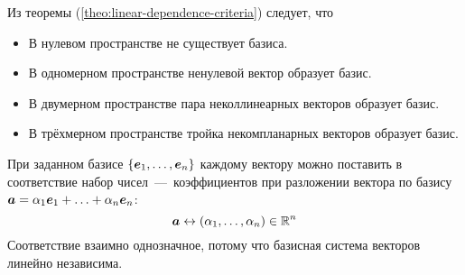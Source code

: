 \documentclass[a4paper,12pt]{article}
\begin{document}
  Из теоремы (\ref{theo:linear-dependence-criteria}) следует, что
  \begin{itemize}
    \item В нулевом пространстве не существует базиса.
    \item В одномерном пространстве ненулевой вектор образует базис.
    \item В двумерном пространстве пара неколлинеарных векторов образует базис.
    \item В трёхмерном пространстве тройка некомпланарных векторов образует базис.
  \end{itemize}
  
  \begin{remark}
    При заданном базисе $\{\boldsymbol e_1, \ldots, \boldsymbol e_n\}$ каждому вектору можно поставить в соответствие набор чисел~---~коэффициентов при разложении вектора по базису $\bds a \hm= \alpha_1 \bds e_1 \hm+ \ldots \hm+ \alpha_n \bds e_n$:
    \[
        \boldsymbol a \leftrightarrow (\alpha_1, \ldots, \alpha_n) \in \operatorname{\mathbb R}^n
    \]
    Соответствие взаимно однозначное, потому что базисная система векторов линейно независима.
  \end{remark}
  
\end{document}
